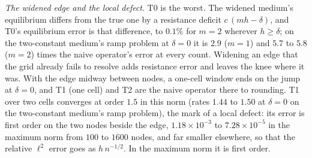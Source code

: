 \documentclass[11pt]{amsart}
\theoremstyle{definition}
\theoremstyle{remark}
\newcommand{\para}[1]{\par\smallskip\noindent\textit{#1}.\enspace}
\newcommand{\sci}[2]{#1 \times 10^{#2}}
\begin{document}
\para{The widened edge and the local defect}
T0 is the worst. The widened medium's equilibrium differs from the true one
by a resistance deficit $c\,(mh - \delta)$, and T0's equilibrium error is
that difference, to $0.1\%$ for $m = 2$ wherever $h \ge \delta$; on the
two-constant medium's ramp problem at $\delta = 0$ it is $2.9$ ($m = 1$) and
$5.7$ to $5.8$ ($m = 2$) times the naive operator's error at every count. Widening an edge
that the grid already fails to resolve adds resistance error and leaves the
knee where it was. With the edge midway between nodes, a one-cell window
ends on the jump at $\delta = 0$, and T1 (one cell) and T2 are the naive
operator there to rounding. T1 over two cells converges at order $1.5$ in
this norm (rates $1.44$ to $1.50$ at $\delta = 0$ on the two-constant
medium's ramp problem),
the mark of a local defect: its error is first order on the two nodes
beside the edge, $\sci{1.18}{-3}$ to $\sci{7.28}{-5}$ in the maximum norm
from $100$ to $1600$ nodes, and far smaller elsewhere, so that the relative
$\ell^2$ error goes as $h\, n^{-1/2}$. In the maximum norm it is first
order.

\begin{table}
  \centering
  \caption{The elliptic problem: $\|e\|_2 / \|u\|_2$ at the nodes for the
  naive operator and the $\delta = 0$ construction at $\delta = 0.01$, the
  seeds at three widths, and T1-FV at $\delta = 0$
  (Remark~\ref{rem:elliptic1d}).}
  \label{tab:equilibrium1d}
  \footnotesize
  
\end{table}
\end{document}
